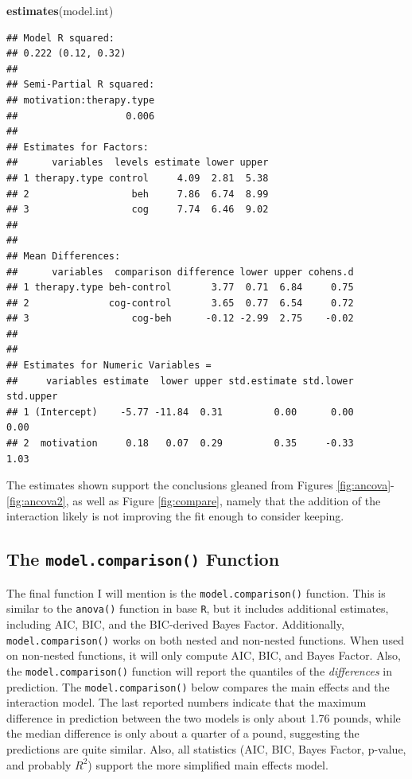 \documentclass[
  man]{apa6}
\newenvironment{Shaded}{\begin{snugshade}}{\end{snugshade}}
\newcommand{\KeywordTok}[1]{\textcolor[rgb]{0.13,0.29,0.53}{\textbf{#1}}}
\newcommand{\NormalTok}[1]{#1}
\begin{document}
\begin{Shaded}
\begin{Highlighting}[]
\KeywordTok{estimates}\NormalTok{(model.int)}
\end{Highlighting}
\end{Shaded}

\begin{verbatim}
## Model R squared:
## 0.222 (0.12, 0.32)
## 
## Semi-Partial R squared:
## motivation:therapy.type 
##                   0.006 
## 
## Estimates for Factors:
##      variables  levels estimate lower upper
## 1 therapy.type control     4.09  2.81  5.38
## 2                  beh     7.86  6.74  8.99
## 3                  cog     7.74  6.46  9.02
## 
## 
## Mean Differences:
##      variables  comparison difference lower upper cohens.d
## 1 therapy.type beh-control       3.77  0.71  6.84     0.75
## 2              cog-control       3.65  0.77  6.54     0.72
## 3                  cog-beh      -0.12 -2.99  2.75    -0.02
## 
## 
## Estimates for Numeric Variables = 
##     variables estimate  lower upper std.estimate std.lower std.upper
## 1 (Intercept)    -5.77 -11.84  0.31         0.00      0.00      0.00
## 2  motivation     0.18   0.07  0.29         0.35     -0.33      1.03
\end{verbatim}

The estimates shown support the conclusions gleaned from Figures \ref{fig:ancova}-\ref{fig:ancova2}, as well as Figure \ref{fig:compare}, namely that the addition of the interaction likely is not improving the fit enough to consider keeping.

\hypertarget{the-model.comparison-function}{%
\subsection{\texorpdfstring{The \texttt{model.comparison()} Function}{The model.comparison() Function}}\label{the-model.comparison-function}}

The final function I will mention is the \texttt{model.comparison()} function. This is similar to the \texttt{anova()} function in base \texttt{R}, but it includes additional estimates, including AIC, BIC, and the BIC-derived Bayes Factor. Additionally, \texttt{model.comparison()} works on both nested and non-nested functions. When used on non-nested functions, it will only compute AIC, BIC, and Bayes Factor. Also, the \texttt{model.comparison()} function will report the quantiles of the \emph{differences} in prediction. The \texttt{model.comparison()} below compares the main effects and the interaction model. The last reported numbers indicate that the maximum difference in prediction between the two models is only about 1.76 pounds, while the median difference is only about a quarter of a pound, suggesting the predictions are quite similar. Also, all statistics (AIC, BIC, Bayes Factor, p-value, and probably \(R^2\)) support the more simplified main effects model.
\end{document}

